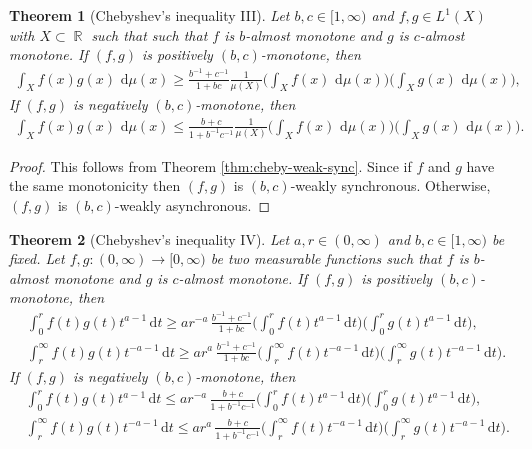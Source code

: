\documentclass[12pt, reqno]{amsart}%
\theoremstyle{plain}  %
\newtheorem{theorem}{Theorem}[section]
\theoremstyle{definition}  %
\theoremstyle{remark}
\numberwithin{equation}{section}
\DeclareMathOperator{\R}{\mathbb{R}}
\renewcommand{\d}{\,\mathrm{d}}
\begin{document}
\begin{theorem}[Chebyshev's inequality III]\label{thm:almost-cheby}
Let  $b, c\in [1,\infty)$ and $f, g\in L^1( X) $ with $X \subset \R$ such that such that $f$ is $b$-almost monotone and $g$ is $c$-almost monotone. If $(f,g)$ is positively $(b,c)$-monotone, then
\begin{align*}
\int_X f(x) g(x)\, \d\mu(x)
\geq
\frac{b^{-1}+c^{-1}}{1+bc}\frac{1}{\mu(X)}
\Big( \int_X f(x)\, \d\mu(x) \Big)
\Big( \int_X g(x)\, \d \mu(x)\Big),
\end{align*}
If $(f,g)$ is negatively $(b,c)$-monotone, then
\begin{align*}
\int_X f(x) g(x)\, \d\mu(x)
\leq
\frac{b+c}{1+b^{-1}c^{-1} }\frac{1}{\mu(X)}
\Big( \int_X f(x)\, \d\mu(x) \Big)
\Big( \int_X g(x)\, \d \mu(x)\Big).
\end{align*}
\end{theorem}

\begin{proof}
This  follows from  Theorem \ref{thm:cheby-weak-sync}. Since if $f$ and $g$ have the same monotonicity then $(f, g)$ is $(b, c)$-weakly synchronous. Otherwise, $(f, g)$ is $(b, c)$-weakly asynchronous.
\end{proof}

\begin{theorem}[Chebyshev's inequality IV]\label{thm:almost-cheby-sing}Let  $a,r\in (0,\infty)$ and $b, c\in [1,\infty)$ be fixed. Let $f, g : (0,\infty) \to [0,\infty)$ be two measurable functions such  that $f$ is $b$-almost monotone and $g$ is $c$-almost monotone. If $(f,g)$ is positively $(b,c)$-monotone, then
\begin{align*}
&\int_0^r f(t) g(t) t^{a-1} \d t
\geq
ar^{-a}\,\frac{b^{-1}+c^{-1}}{1+bc}
\Big( \int_0^r f(t) t^{a-1} \d t \Big)
\Big( \int_0^r g(t) t^{a-1} \d t \Big),\\
&\int_r^\infty f(t) g(t) t^{-a-1} \d t
\geq
ar^{a}\,\frac{b^{-1}+c^{-1}}{1+bc}
\Big( \int_r^\infty f(t) t^{-a-1} \d t \Big)
\Big( \int_r^\infty g(t) t^{-a-1} \d t \Big).
\end{align*}
If $(f,g)$ is negatively $(b,c)$-monotone, then
\begin{align*}
&\int_0^r f(t) g(t) t^{a-1} \d t
\leq
ar^{-a}\,\frac{b+c}{1+b^{-1}c^{-1}}
\Big( \int_0^r f(t) t^{a-1} \d t \Big)
\Big( \int_0^r g(t) t^{a-1} \d t \Big),\\
&\int_r^\infty f(t) g(t) t^{-a-1} \d t
\leq
ar^{a}\,\frac{b+c}{1+b^{-1}c^{-1}}
\Big( \int_r^\infty f(t) t^{-a-1} \d t \Big)
\Big( \int_r^\infty g(t) t^{-a-1} \d t \Big).
\end{align*}
\end{theorem}
\end{document}
